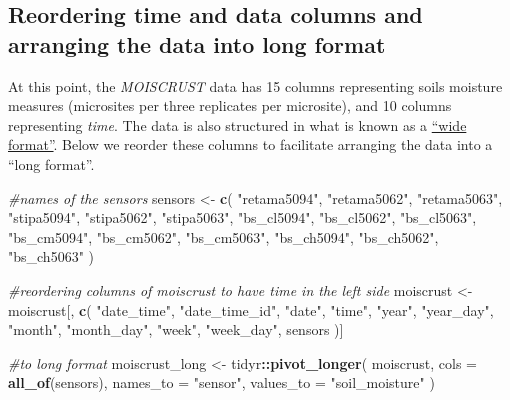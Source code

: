 \documentclass[]{article}
\newenvironment{Shaded}{\begin{snugshade}}{\end{snugshade}}
\newcommand{\CommentTok}[1]{\textcolor[rgb]{0.56,0.35,0.01}{\textit{#1}}}
\newcommand{\DataTypeTok}[1]{\textcolor[rgb]{0.13,0.29,0.53}{#1}}
\newcommand{\KeywordTok}[1]{\textcolor[rgb]{0.13,0.29,0.53}{\textbf{#1}}}
\newcommand{\NormalTok}[1]{#1}
\newcommand{\OperatorTok}[1]{\textcolor[rgb]{0.81,0.36,0.00}{\textbf{#1}}}
\newcommand{\StringTok}[1]{\textcolor[rgb]{0.31,0.60,0.02}{#1}}
\begin{document}
\hypertarget{reordering-time-and-data-columns-and-arranging-the-data-into-long-format}{%
\subsection{Reordering time and data columns and arranging the data into
long
format}\label{reordering-time-and-data-columns-and-arranging-the-data-into-long-format}}

At this point, the \emph{MOISCRUST} data has 15 columns representing
soils moisture measures (microsites per three replicates per microsite),
and 10 columns representing \emph{time}. The data is also structured in
what is known as a
\href{https://sejdemyr.github.io/r-tutorials/basics/wide-and-long/}{``wide
format''}. Below we reorder these columns to facilitate arranging the
data into a ``long format''.

\begin{Shaded}
\begin{Highlighting}[]
\CommentTok{#names of the sensors}
\NormalTok{sensors <-}\StringTok{ }\KeywordTok{c}\NormalTok{(}
  \StringTok{"retama5094"}\NormalTok{,}
  \StringTok{"retama5062"}\NormalTok{,}
  \StringTok{"retama5063"}\NormalTok{,}
  \StringTok{"stipa5094"}\NormalTok{,}
  \StringTok{"stipa5062"}\NormalTok{,}
  \StringTok{"stipa5063"}\NormalTok{,}
  \StringTok{"bs_cl5094"}\NormalTok{,}
  \StringTok{"bs_cl5062"}\NormalTok{,}
  \StringTok{"bs_cl5063"}\NormalTok{,}
  \StringTok{"bs_cm5094"}\NormalTok{,}
  \StringTok{"bs_cm5062"}\NormalTok{,}
  \StringTok{"bs_cm5063"}\NormalTok{,}
  \StringTok{"bs_ch5094"}\NormalTok{,}
  \StringTok{"bs_ch5062"}\NormalTok{,}
  \StringTok{"bs_ch5063"}
\NormalTok{)}

\CommentTok{#reordering columns of moiscrust to have time in the left side}
\NormalTok{moiscrust <-}\StringTok{ }\NormalTok{moiscrust[, }\KeywordTok{c}\NormalTok{(}
  \StringTok{"date_time"}\NormalTok{,}
  \StringTok{"date_time_id"}\NormalTok{,}
  \StringTok{"date"}\NormalTok{,}
  \StringTok{"time"}\NormalTok{,}
  \StringTok{"year"}\NormalTok{,}
  \StringTok{"year_day"}\NormalTok{,}
  \StringTok{"month"}\NormalTok{,}
  \StringTok{"month_day"}\NormalTok{,}
  \StringTok{"week"}\NormalTok{,}
  \StringTok{"week_day"}\NormalTok{,}
\NormalTok{  sensors}
\NormalTok{)]}

\CommentTok{#to long format}
\NormalTok{moiscrust_long <-}\StringTok{ }\NormalTok{tidyr}\OperatorTok{::}\KeywordTok{pivot_longer}\NormalTok{(}
\NormalTok{  moiscrust,}
  \DataTypeTok{cols =} \KeywordTok{all_of}\NormalTok{(sensors),}
  \DataTypeTok{names_to =} \StringTok{"sensor"}\NormalTok{,}
  \DataTypeTok{values_to =} \StringTok{"soil_moisture"}
\NormalTok{)}
\end{Highlighting}
\end{Shaded}
\end{document}
